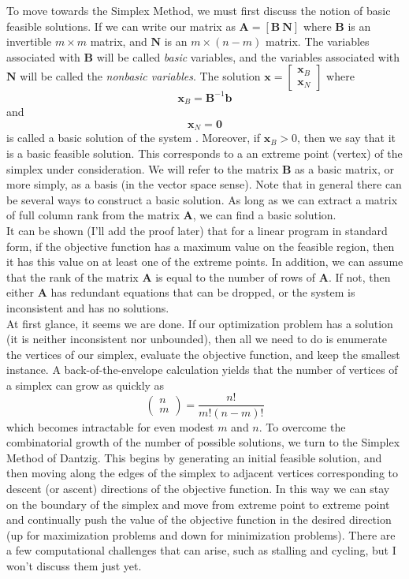 \documentclass[12pt,english]{article}
\begin{document}
To move towards the Simplex Method, we must first discuss the notion of basic feasible solutions.   If we can write our matrix as $\mathbf{A} = [\mathbf{B}~ \mathbf{N}]$ where $\mathbf{B}$ is an invertible $m \times m$ matrix, and $\mathbf{N}$ is an $m \times (n-m)$ matrix.  The variables associated with $\mathbf{B}$ will be called {\it basic} variables, and the variables associated with $\mathbf{N}$ will be called the {\it nonbasic variables}. The solution $\mathbf{x} = \left[\begin{array}{c} \mathbf{x}_B \\ \mathbf{x}_N \end{array}\right]$ where 
$$
\mathbf{x}_B = \mathbf{B}^{-1} \mathbf{b}
$$
and
$$
\mathbf{x}_N = \mathbf{0}
$$
is called a basic solution of the system \cite{BaJaSh:90}.  Moreover, if $\mathbf{x}_B >0$, then we say that it is a basic feasible solution.  This corresponds to a an extreme point (vertex) of the simplex under consideration.  We will refer to the matrix $\mathbf{B}$ as a basic matrix, or more simply, as a basis (in the vector space sense).  Note that in general there can be several ways to construct a basic solution.  As long as we can extract a matrix of full column rank from the matrix $\mathbf{A}$, we can find a basic solution.   \\


It can be shown (I'll add the proof later) that for a linear program in standard form, if the objective function has a maximum value on the feasible region, then it has this value on at least one of the extreme points.   In addition, we can assume that the rank of the matrix $\mathbf{A}$ is equal to the number of rows of $\mathbf{A}$.  If not, then either $\mathbf{A}$ has redundant equations that can be dropped, or the system is inconsistent and has no solutions.\\

At first glance, it seems we are done.  If our optimization problem has a solution (it is neither inconsistent nor unbounded), then all we need to do is enumerate the vertices of our simplex, evaluate the objective function, and keep the smallest instance.  A back-of-the-envelope calculation yields that the number of vertices of a simplex can grow as quickly as
$$
\left(
\begin{array}{c}
n\\
m
\end{array}
\right)
= 
\frac{n!}{m!(n-m)!}
$$
which becomes intractable for even modest $m$ and $n$.  To overcome the combinatorial growth of the number of possible solutions, we turn to the Simplex Method of Dantzig.   This begins by generating an initial feasible solution, and then moving along the edges of the simplex to adjacent vertices corresponding to descent (or ascent) directions of the objective function.  In this way we can stay on the boundary of the simplex and move from extreme point to extreme point and continually push the value of the objective function in the desired direction (up for maximization problems and down for minimization problems).  There are a few computational challenges that can arise, such as stalling and cycling, but I won't discuss them just yet.\\
\end{document}
